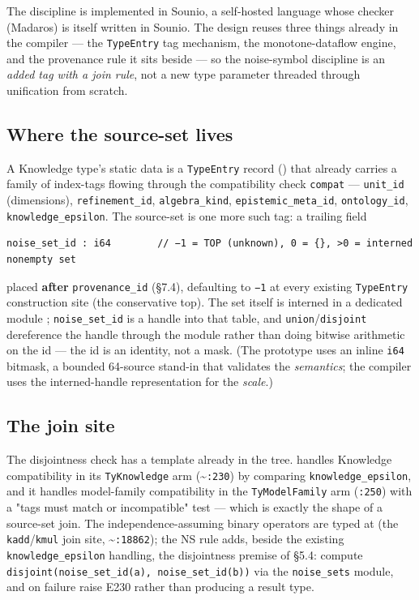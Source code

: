 \documentclass[sigplan,review,anonymous,10pt]{acmart}
\begin{document}
The discipline is implemented in Sounio, a self-hosted language whose checker (Madaros) is itself written in Sounio. The design reuses three things already in the compiler --- the \texttt{TypeEntry} tag mechanism, the monotone-dataflow engine, and the provenance rule it sits beside --- so the noise-symbol discipline is an \emph{added tag with a join rule}, not a new type parameter threaded through unification from scratch.

\subsection{Where the source-set lives}

A Knowledge type's static data is a \texttt{TypeEntry} record () that already carries a family of index-tags flowing through the compatibility check \texttt{compat} --- \texttt{unit\_id} (dimensions), \texttt{refinement\_id}, \texttt{algebra\_kind}, \texttt{epistemic\_meta\_id}, \texttt{ontology\_id}, \texttt{knowledge\_epsilon}. The source-set is one more such tag: a trailing field

\begin{lstlisting}
noise_set_id : i64        // −1 = TOP (unknown), 0 = {}, >0 = interned nonempty set
\end{lstlisting}

placed \textbf{after} \texttt{provenance\_id} (§7.4), defaulting to \texttt{−1} at every existing \texttt{TypeEntry} construction site (the conservative top). The set itself is interned in a dedicated module ; \texttt{noise\_set\_id} is a handle into that table, and \texttt{union}/\texttt{disjoint} dereference the handle through the module rather than doing bitwise arithmetic on the id --- the id is an identity, not a mask. (The prototype  uses an inline \texttt{i64} bitmask, a bounded 64-source stand-in that validates the \emph{semantics}; the compiler uses the interned-handle representation for the \emph{scale}.)

\subsection{The join site}

The disjointness check has a template already in the tree.  handles Knowledge compatibility in its \texttt{TyKnowledge} arm (\textasciitilde{}\texttt{:230}) by comparing \texttt{knowledge\_epsilon}, and it handles model-family compatibility in the \texttt{TyModelFamily} arm (\texttt{:250}) with a  "tags must match or incompatible" test --- which is exactly the shape of a source-set join. The independence-assuming binary operators are typed at  (the \texttt{kadd}/\texttt{kmul} join site, \textasciitilde{}\texttt{:18862}); the NS rule adds, beside the existing \texttt{knowledge\_epsilon} handling, the disjointness premise of §5.4: compute \texttt{disjoint(noise\_set\_id(a), noise\_set\_id(b))} via the \texttt{noise\_sets} module, and on failure raise E230 rather than producing a result type.
\end{document}
